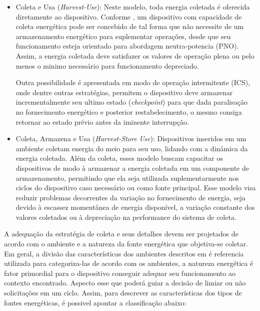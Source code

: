 \begin{itemize}
    \item Coleta e Usa (\textit{Harvest-Use}): Neste modelo, toda energia coletada é oferecida diretamente ao dispositivo. Conforme , um dispositivo com capacidade de coleta energética pode ser concebido de tal forma que não necessite de um armazenamento energético para suplementar operações, desde que seu funcionamento esteja orientado para abordagem neutra-potencia (\acl{PNO}). Assim, a energia coletada deve satisfazer os valores de operação plena ou pelo menos o minimo necessário para funcionamento depreciado.
        
     Outra possibilidade é apresentada em modo de operação intermitente (\acl{ICS}), onde dentre outras estratégias, permitem o dispositivo deve armazenar incrementalmente seu ultimo estado (\textit{checkpoint}) para que dada paralisação no fornecimento energético e posterior restabelecimento, o mesmo consiga retornar ao estado prévio antes da iminente interrupção. 
        
    \item Coleta, Armazena e Usa (\textit{Harvest-Store Use}): Dispositivos inseridos em um ambiente coletam energia do meio para seu uso, lidando com a dinâmica da energia coletada. Além da coleta, esses modelo buscam capacitar os dispositivos de modo à armazenar a energia coletada em um componente de armazenamento, permitindo que ela seja utilizada suplementarmente nos ciclos do dispositivo caso necessário ou como fonte principal. Esse modelo visa reduzir problemas decorrentes da variação no fornecimento de energia, seja devido à escassez momentânea de energia disponível, a variação constante dos valores coletados ou à depreciação na performance do sistema de coleta.
    
\end{itemize}


 A adequação da estratégia de coleta e seus detalhes devem ser projetados de acordo com o ambiente e a natureza da fonte energética que objetiva-se coletar. Em geral, a divisão das características dos ambientes descritos em \cite{shaikh_energy_2016} é referencia utilizada para categoriza-las de acordo com os ambientes, a natureza energética é fator primordial para o dispositivo conseguir adequar seu funcionamento ao contexto encontrado. Aspecto esse que poderá guiar a decisão de limiar ou não solicitações em um ciclo. Assim, para descrever as características dos tipos de fontes energéticas, é possivel apontar a classificação abaixo:
 
